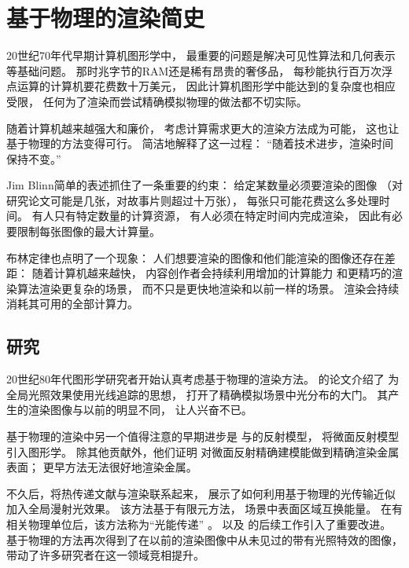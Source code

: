\section{基于物理的渲染简史}\label{sec:基于物理的渲染简史}

20世纪70年代早期计算机图形学中，
最重要的问题是解决可见性算法和几何表示等基础问题。
那时兆字节的RAM还是稀有昂贵的奢侈品，
每秒能执行百万次浮点运算的计算机要花费数十万美元，
因此计算机图形学中能达到的复杂度也相应受限，
任何为了渲染而尝试精确模拟物理的做法都不切实际。

随着计算机越来越强大和廉价，
考虑计算需求更大的渲染方法成为可能，
这也让基于物理的方法变得可行。
简洁地解释了这一过程：
“随着技术进步，渲染时间保持不变。”

Jim Blinn简单的表述抓住了一条重要的约束：
给定某数量必须要渲染的图像
（对研究论文可能是几张，对故事片则超过十万张），
每张只可能花费这么多处理时间。
有人只有特定数量的计算资源，
有人必须在特定时间内完成渲染，
因此有必要限制每张图像的最大计算量。

布林定律也点明了一个现象：
人们想要渲染的图像和他们能渲染的图像还存在差距：
随着计算机越来越快，
内容创作者会持续利用增加的计算能力
和更精巧的渲染算法渲染更复杂的场景，
而不只是更快地渲染和以前一样的场景。
渲染会持续消耗其可用的全部计算力。

\subsection{研究}\label{sub:研究}
20世纪80年代图形学研究者开始认真考虑基于物理的渲染方法。
\citet{10.1145/358876.358882}的论文介绍了
为全局光照效果使用光线追踪的思想，
打开了精确模拟场景中光分布的大门。
其产生的渲染图像与以前的明显不同，
让人兴奋不已。

基于物理的渲染中另一个值得注意的早期进步是
\citet{10.1145/800224.806819}与\citet{10.1145/357290.357293}的反射模型，
将微面反射模型引入图形学。
除其他贡献外，他们证明
对微面反射精确建模能做到精确渲染金属表面；
更早方法无法很好地渲染金属。

不久后，\citet{10.1145/800031.808601}将热传递文献与渲染联系起来，
展示了如何利用基于物理的光传输近似加入全局漫射光效果。
该方法基于有限元方法，
场景中表面区域互换能量。
在有相关物理单位后，该方法称为“光能传递”
。
\citet{10.1145/325334.325171}以及
\citet{10.1145/325334.325169}的后续工作引入了重要改进。
基于物理的方法再次得到了在以前的渲染图像中从未见过的带有光照特效的图像，
带动了许多研究者在这一领域竞相提升。

